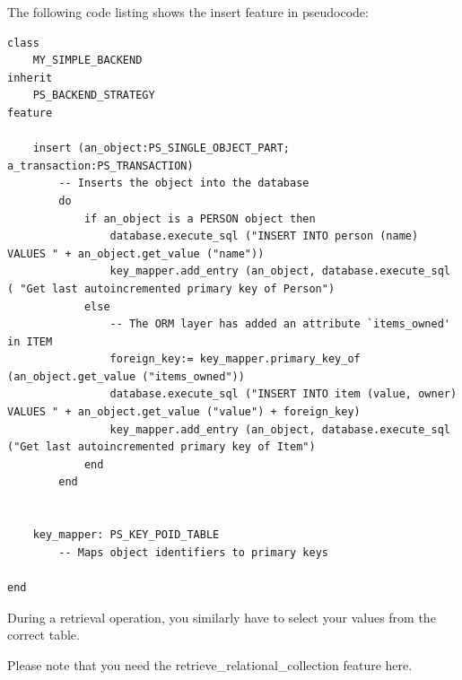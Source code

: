 The following code listing shows the insert feature in pseudocode:

\begin{lstlisting}[language=OOSC2Eiffel, captionpos=b, caption={The collection handler for LINKED\_LIST}, label={lst:my_backend_adaption}]
class 
	MY_SIMPLE_BACKEND
inherit
	PS_BACKEND_STRATEGY
feature

	insert (an_object:PS_SINGLE_OBJECT_PART; a_transaction:PS_TRANSACTION)
		-- Inserts the object into the database
		do
			if an_object is a PERSON object then
				database.execute_sql ("INSERT INTO person (name) VALUES " + an_object.get_value ("name"))
				key_mapper.add_entry (an_object, database.execute_sql ( "Get last autoincremented primary key of Person")
			else
				-- The ORM layer has added an attribute `items_owned' in ITEM
				foreign_key:= key_mapper.primary_key_of (an_object.get_value ("items_owned"))
				database.execute_sql ("INSERT INTO item (value, owner) VALUES " + an_object.get_value ("value") + foreign_key)
				key_mapper.add_entry (an_object, database.execute_sql ("Get last autoincremented primary key of Item")
			end
		end


	key_mapper: PS_KEY_POID_TABLE
		-- Maps object identifiers to primary keys

end
\end{lstlisting}

During a retrieval operation, you similarly have to select your values from the correct table.

Please note that you need the retrieve\_relational\_collection feature here.







